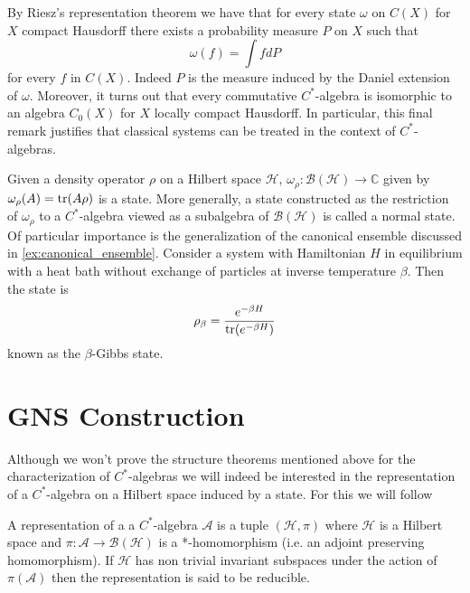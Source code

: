 \begin{example}
By Riesz's representation theorem \cite{Hewitt1975} we have that for every state $\omega$ on $C(X)$ for $X$ compact Hausdorff there exists a probability measure $P$ on $X$ such that
\begin{equation}
\omega (f)=\int fdP
\end{equation}    
for every $f$ in $C(X)$. Indeed $P$ is the measure induced by the Daniel extension of $\omega$. Moreover, it turns out that every commutative $C^*$-algebra is isomorphic to an algebra $C_0(X)$ for $X$ locally compact Hausdorff\cite{Bratteli1997}. In particular, this final remark justifies that classical systems can be treated in the context of $C^*$-algebras. 
\end{example}

\begin{example}\label{ex:Gibbs}
Given a density operator $\rho$ on a Hilbert space $\mathcal{H}$, $\omega_\rho:\mathcal{B} (\mathcal{H})\rightarrow\mathbb{C}$ given by $\omega_\rho(A)=\operatorname{tr}(A\rho)$ is a state. More generally, a state constructed as the restriction of $\omega_\rho$ to a $C^*$-algebra viewed as a subalgebra of $\mathcal{B}(\mathcal{H})$ is called a normal state. Of particular importance is the generalization of the canonical ensemble discussed in \ref{ex:canonical_ensemble}. Consider a system with Hamiltonian $H$ in equilibrium with a heat bath without exchange of particles at inverse temperature $\beta$. Then the state is
\begin{equation}
\rho_\beta=\frac{e^{-\beta H}}{\operatorname{tr}(e^{-\beta H})}
\end{equation}
known as the $\beta$-Gibbs state\cite{Kubo1965}\cite{Duvenhage1999}. 
\end{example}

\section{GNS Construction}

Although we won't prove the structure theorems mentioned above for the characterization of $C^*$-algebras we will indeed be interested in the representation of a $C^*$-algebra on a Hilbert space induced by a state. For this we will follow \cite{Bratteli1997} 

\begin{definition}
A representation of a a $C^*$-algebra $\mathcal{A}$ is a tuple $(\mathcal{H},\pi)$ where $\mathcal{H}$ is a Hilbert space and $\pi:\mathcal{A}\rightarrow \mathcal{B}(\mathcal{H})$ is a *-homomorphism (i.e. an adjoint preserving homomorphism). If $\mathcal{H}$ has non trivial invariant subspaces under the action of $\pi(\mathcal{A})$ then the representation is said to be reducible.
\end{definition}

